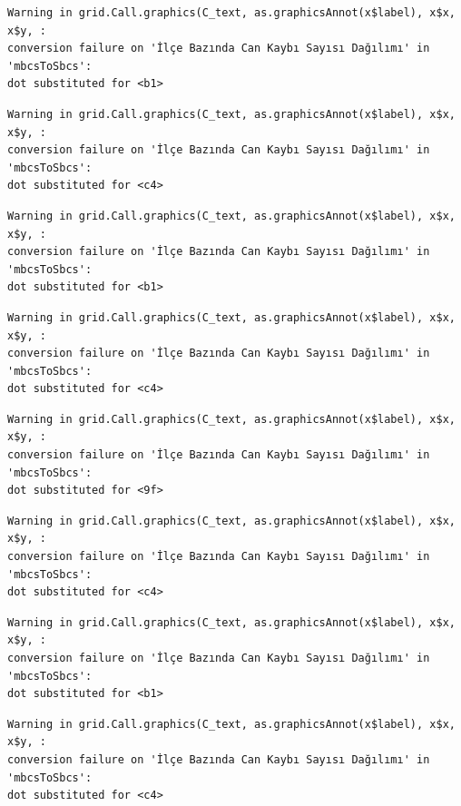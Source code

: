 \documentclass[
  11pt,
  a4paper,
  DIV=11,
  numbers=noendperiod]{scrartcl}
\begin{document}
\begin{verbatim}
Warning in grid.Call.graphics(C_text, as.graphicsAnnot(x$label), x$x, x$y, :
conversion failure on 'İlçe Bazında Can Kaybı Sayısı Dağılımı' in 'mbcsToSbcs':
dot substituted for <b1>
\end{verbatim}

\begin{verbatim}
Warning in grid.Call.graphics(C_text, as.graphicsAnnot(x$label), x$x, x$y, :
conversion failure on 'İlçe Bazında Can Kaybı Sayısı Dağılımı' in 'mbcsToSbcs':
dot substituted for <c4>
\end{verbatim}

\begin{verbatim}
Warning in grid.Call.graphics(C_text, as.graphicsAnnot(x$label), x$x, x$y, :
conversion failure on 'İlçe Bazında Can Kaybı Sayısı Dağılımı' in 'mbcsToSbcs':
dot substituted for <b1>
\end{verbatim}

\begin{verbatim}
Warning in grid.Call.graphics(C_text, as.graphicsAnnot(x$label), x$x, x$y, :
conversion failure on 'İlçe Bazında Can Kaybı Sayısı Dağılımı' in 'mbcsToSbcs':
dot substituted for <c4>
\end{verbatim}

\begin{verbatim}
Warning in grid.Call.graphics(C_text, as.graphicsAnnot(x$label), x$x, x$y, :
conversion failure on 'İlçe Bazında Can Kaybı Sayısı Dağılımı' in 'mbcsToSbcs':
dot substituted for <9f>
\end{verbatim}

\begin{verbatim}
Warning in grid.Call.graphics(C_text, as.graphicsAnnot(x$label), x$x, x$y, :
conversion failure on 'İlçe Bazında Can Kaybı Sayısı Dağılımı' in 'mbcsToSbcs':
dot substituted for <c4>
\end{verbatim}

\begin{verbatim}
Warning in grid.Call.graphics(C_text, as.graphicsAnnot(x$label), x$x, x$y, :
conversion failure on 'İlçe Bazında Can Kaybı Sayısı Dağılımı' in 'mbcsToSbcs':
dot substituted for <b1>
\end{verbatim}

\begin{verbatim}
Warning in grid.Call.graphics(C_text, as.graphicsAnnot(x$label), x$x, x$y, :
conversion failure on 'İlçe Bazında Can Kaybı Sayısı Dağılımı' in 'mbcsToSbcs':
dot substituted for <c4>
\end{verbatim}
\end{document}
